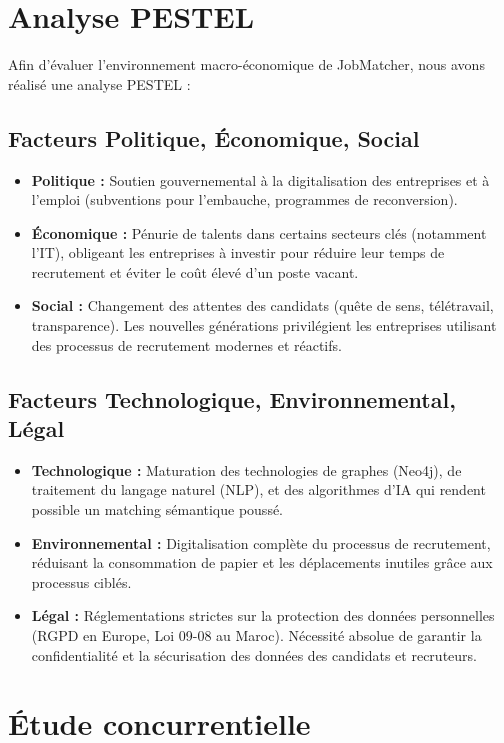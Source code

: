 \documentclass[12pt,a4paper]{report}
\begin{document}
\section{Analyse PESTEL}

Afin d'évaluer l'environnement macro-économique de JobMatcher, nous avons réalisé une analyse PESTEL :

\subsection{Facteurs Politique, Économique, Social}
\begin{itemize}
    \item \textbf{Politique :} Soutien gouvernemental à la digitalisation des entreprises et à l'emploi (subventions pour l'embauche, programmes de reconversion).
    \item \textbf{Économique :} Pénurie de talents dans certains secteurs clés (notamment l'IT), obligeant les entreprises à investir pour réduire leur temps de recrutement et éviter le coût élevé d'un poste vacant.
    \item \textbf{Social :} Changement des attentes des candidats (quête de sens, télétravail, transparence). Les nouvelles générations privilégient les entreprises utilisant des processus de recrutement modernes et réactifs.
\end{itemize}

\subsection{Facteurs Technologique, Environnemental, Légal}
\begin{itemize}
    \item \textbf{Technologique :} Maturation des technologies de graphes (Neo4j), de traitement du langage naturel (NLP), et des algorithmes d'IA qui rendent possible un matching sémantique poussé.
    \item \textbf{Environnemental :} Digitalisation complète du processus de recrutement, réduisant la consommation de papier et les déplacements inutiles grâce aux processus ciblés.
    \item \textbf{Légal :} Réglementations strictes sur la protection des données personnelles (RGPD en Europe, Loi 09-08 au Maroc). Nécessité absolue de garantir la confidentialité et la sécurisation des données des candidats et recruteurs.
\end{itemize}

\section{Étude concurrentielle}
\end{document}
